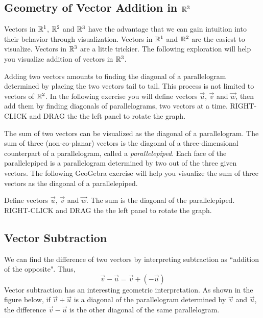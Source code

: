 \documentclass{ximera}
\begin{document}
\subsection*{Geometry of Vector Addition in $\mathbb{R}^3$}
Vectors in $\mathbb{R}^1$, $\mathbb{R}^2$ and $\mathbb{R}^3$ have the advantage that we can gain intuition into their behavior through visualization.  Vectors in $\mathbb{R}^1$ and $\mathbb{R}^2$ are the easiest to visualize.  Vectors in $\mathbb{R}^3$ are a little trickier.  The following exploration will help you visualize addition of vectors in $\mathbb{R}^3$.
\begin{exploration}\label{exp:addInR3}
    Adding two vectors amounts to finding the diagonal of a parallelogram determined by placing the two vectors tail to tail.  This process is not limited to vectors of $\mathbb{R}^2$.  In the following exercise you will define vectors $\vec{u}$, $\vec{v}$ and $\vec{w}$, then add them by finding diagonals of parallelograms, two vectors at a time. RIGHT-CLICK and DRAG the the left panel to rotate the graph.

\begin{center} 
\end{center}

The sum of two vectors can be visualized as the diagonal of a parallelogram.  The sum of three (non-co-planar) vectors is the diagonal of a three-dimensional counterpart of a parallelogram, called a \emph{parallelepiped}.  Each face of the parallelepiped is a parallelogram determined by two out of the three given vectors.  The following GeoGebra exercise will help you visualize the sum of three vectors as the diagonal of a parallelepiped.

Define vectors $\vec{u}$, $\vec{v}$ and $\vec{w}$.  The sum is the diagonal of the parallelepiped.  RIGHT-CLICK and DRAG the the left panel to rotate the graph.

\begin{center} 
\end{center}
\end{exploration}

\subsection*{Vector Subtraction}
We can find the difference of two vectors by interpreting subtraction as ``addition of the opposite".  Thus,
$$\vec{v}-\vec{u}=\vec{v}+(-\vec{u})$$
Vector subtraction has an interesting geometric interpretation.  As shown in the figure below, if $\vec{v}+\vec{u}$ is a diagonal of the parallelogram determined by $\vec{v}$ and $\vec{u}$, the difference $\vec{v}-\vec{u}$ is the other diagonal of the same parallelogram.
\end{document}

